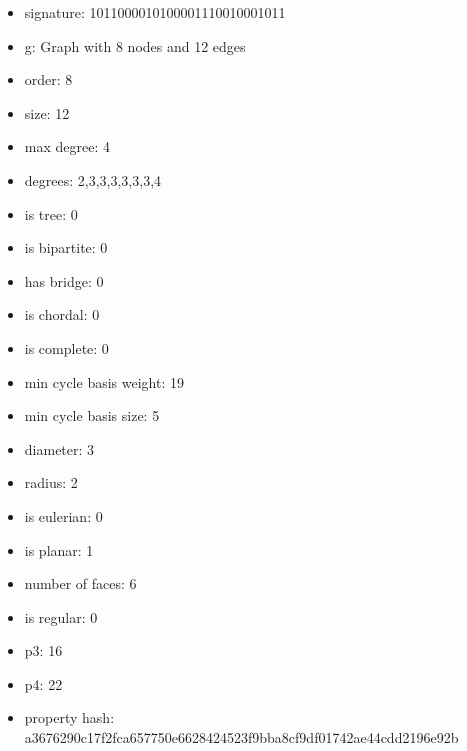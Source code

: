 \begin{itemize}
\item signature: 1011000010100001110010001011
\item g: Graph with 8 nodes and 12 edges
\item order: 8
\item size: 12
\item max degree: 4
\item degrees: 2,3,3,3,3,3,3,4
\item is tree: 0
\item is bipartite: 0
\item has bridge: 0
\item is chordal: 0
\item is complete: 0
\item min cycle basis weight: 19
\item min cycle basis size: 5
\item diameter: 3
\item radius: 2
\item is eulerian: 0
\item is planar: 1
\item number of faces: 6
\item is regular: 0
\item p3: 16
\item p4: 22
\item property hash: a3676290c17f2fca657750e6628424523f9bba8cf9df01742ae44cdd2196e92b
\end{itemize}
\newpage
\begin{figure}
\end{figure}
